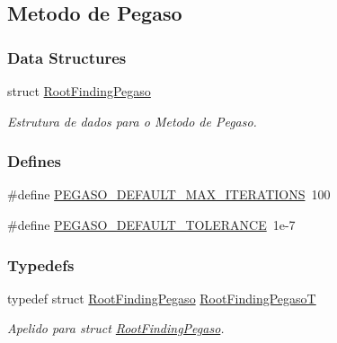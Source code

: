 \hypertarget{group____pegaso}{
\subsection{Metodo de Pegaso}
\label{group____pegaso}
}
\subsubsection*{Data Structures}
\begin{CompactItemize}
\item 
struct \hyperlink{structRootFindingPegaso}{RootFindingPegaso}
\begin{CompactList}\small\item\em Estrutura de dados para o Metodo de Pegaso. \item\end{CompactList}\end{CompactItemize}
\subsubsection*{Defines}
\begin{CompactItemize}
\item 
\#define \hyperlink{group____pegaso_gd5756b72d3091ff42470aa73e96b70df}{PEGASO\_\-DEFAULT\_\-MAX\_\-ITERATIONS}~100
\item 
\#define \hyperlink{group____pegaso_gfb0e1657b5a35c9f071c5bd67a29263d}{PEGASO\_\-DEFAULT\_\-TOLERANCE}~1e-7
\end{CompactItemize}
\subsubsection*{Typedefs}
\begin{CompactItemize}
\item 
typedef struct \hyperlink{structRootFindingPegaso}{RootFindingPegaso} \hyperlink{group____pegaso_gd48e82d0f19968cca8a006303b6775ee}{RootFindingPegasoT}
\begin{CompactList}\small\item\em Apelido para struct \hyperlink{structRootFindingPegaso}{RootFindingPegaso}. \item\end{CompactList}\end{CompactItemize}
